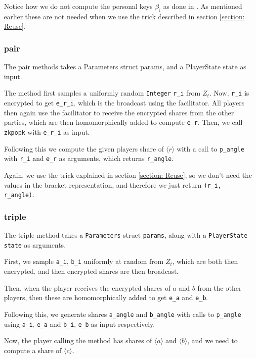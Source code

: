 \documentclass[../main.tex]{subfiles}
\begin{document}
Notice how we do not compute the personal keys $\beta_i$ as done in \cite{damgaard2012multiparty}. As mentioned earlier these are not needed when we use the trick described in section \ref{section: Reuse}.
\subsubsection{pair}
The pair methods takes a Parameters struct params, and a PlayerState state as input.

The method first samples a uniformly random \lstinline{Integer} \lstinline{r_i} from $Z_t$. Now, \lstinline{r_i} is encrypted to get \lstinline{e_r_i}, which is the broadcast using the facilitator. All players then again use the facilitator to receive the encrypted shares from the other parties, which are then homomorphically added to compute \lstinline{e_r}. Then, we call \lstinline{zkpopk} with \lstinline{e_r_i} as input.

Following this we compute the given players share of $\langle r \rangle$ with a call to \lstinline{p_angle} with \lstinline{r_i} and \lstinline{e_r} as arguments, which returns \lstinline{r_angle}.

Again, we use the trick explained in section \ref{section: Reuse}, so we don't need the values in the bracket representation, and therefore we just return \lstinline{(r_i, r_angle)}.

\subsubsection{triple}
The triple method takes a \lstinline{Parameters} struct \lstinline{params}, along with a \lstinline{PlayerState} \lstinline{state} as arguments.

First, we sample \lstinline{a_i}, \lstinline{b_i} uniformly at random from $Z_t$, which are both then encrypted, and then encrypted shares are then broadcast.

Then, when the player receives the encrypted shares of $a$ and $b$ from the other players, then these are homomorphically added to get \lstinline{e_a} and \lstinline{e_b}.

Following this, we generate shares \lstinline{a_angle} and \lstinline{b_angle} with calls to \lstinline{p_angle} using \lstinline{a_i}, \lstinline{e_a} and \lstinline{b_i}, \lstinline{e_b} as input respectively.

Now, the player calling the method has shares of $\langle a \rangle$ and $\langle b \rangle$, and we need to compute a share of $\langle c \rangle$.
\end{document}
